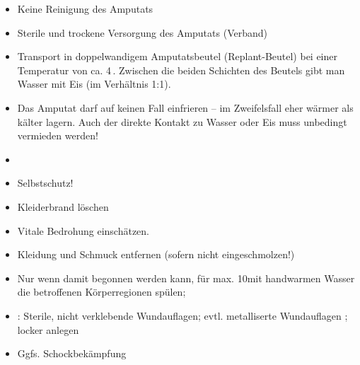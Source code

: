 {%
\begin{itemize}
  \item Keine Reinigung des Amputats
  \item Sterile und trockene Versorgung des Amputats
  (Verband)
  \item Transport in doppelwandigem
  Amputatsbeutel (Replant-Beutel) bei  einer Temperatur von
  ca. 4\,\DegC \cite{BoehmerTaschRett6,Gorgass7,LPN3}.
  Zwischen die beiden Schichten des Beutels gibt man Wasser
  mit Eis (im Verhältnis 1:1).
  \item Das Amputat darf auf keinen Fall einfrieren -- im
  Zweifelsfall eher wärmer als kälter lagern. Auch der
  direkte Kontakt zu Wasser oder Eis muss unbedingt
  vermieden werden!
  \item {}
\end{itemize}
}

{    
\begin{itemize}
  \item Selbstschutz!
  \item Kleiderbrand löschen
  \item Vitale Bedrohung einschätzen. \TxBeiVit \TxMassVitMK
  \item Kleidung und Schmuck entfernen (sofern nicht  eingeschmolzen!)
  \item Nur wenn 
  damit begonnen werden kann, für max. 10\Min* mit handwarmen
  Wasser die betroffenen Körperregionen spülen;
  
  \item {}: Sterile, nicht verklebende
  Wundauflagen; evtl. metalliserte Wundauflagen
  \cite{Helfen2008,RedelsteinerHRNS1}; locker anlegen
  \item Ggfs. Schockbekämpfung
\end{itemize}
}

